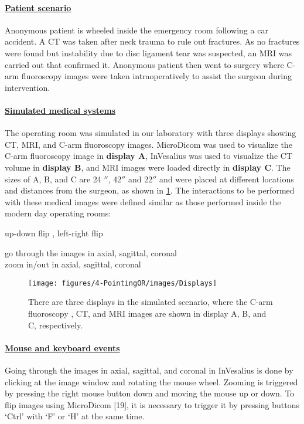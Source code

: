 \paragraph{\underline{Patient scenario}}Anonymous patient is wheeled inside the emergency room following a car accident. A CT was taken after neck trauma to rule out fractures. As no fractures were found but instability due to disc ligament tear was suspected, an MRI was carried out that confirmed it. Anonymous patient then went to surgery where C-arm fluoroscopy images were taken intraoperatively to assist the surgeon during intervention.
\paragraph{\underline{Simulated medical systems}}
The operating room was simulated in our laboratory with three displays showing CT, MRI, and C-arm fluoroscopy images. 
MicroDicom\cite{Tangcharoen2011} was used to visualize the C-arm fluoroscopy image in \textbf{display A}, InVesalius\cite{Moraes2012} was used to visualize the CT volume in \textbf{display B}, and MRI images were loaded directly in \textbf{display C}. The sizes of A, B, and C are 24 $''$, 42$''$ and 22$''$ and were placed at different locations and distances from the surgeon, as shown in \figurename{\ref{fig:ORSEnvironment}}. The interactions to be performed with these medical images were defined similar as those performed inside the modern day operating rooms:
\begin{description}
	[align=right,style=nextline,leftmargin= 0.3\linewidth,labelsep=\parindent,font=\normalfont]
	\item [Fluoroscopy image:] up-down flip , left-right flip
	\item [CT \& MRI images:] go through the images in axial, sagittal, coronal\\ zoom in/out in axial, sagittal, coronal
\end{description}
\begin{figure}
	\centering
	\texttt{[image: figures/4-PointingOR/images/Displays]}
	\caption{There are three displays in the simulated scenario, where the C-arm fluoroscopy , CT, and MRI images are shown in display A, B, and C, respectively.}
	\label{fig:ORSEnvironment}       %
\end{figure}
\paragraph{\underline{Mouse and keyboard events}} 
Going through the images in axial, sagittal, and coronal in InVesalius\cite{Moraes2012} is done by clicking at the image window and rotating the mouse wheel. Zooming is triggered by pressing the right mouse button down and moving the mouse up or down. To flip images using MicroDicom [19], it is necessary to trigger it by pressing buttons `Ctrl' with `F' or `H' at the same time. 

